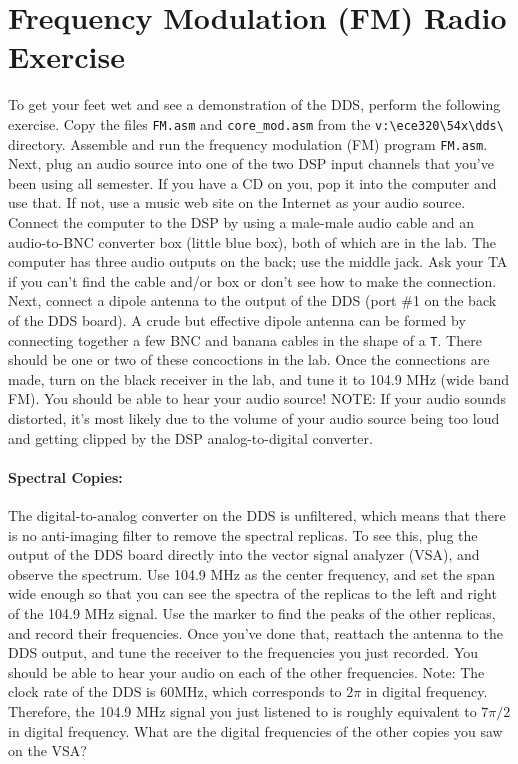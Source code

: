 \section{Frequency Modulation (FM) Radio Exercise}
To get your feet wet and see a demonstration 
of the DDS, perform the following exercise.  
Copy the files \verb+FM.asm+ and \verb+core_mod.asm+ from the 
\verb+v:\ece320\54x\dds\+ directory.  Assemble
 and run the frequency modulation (FM) program
 \verb+FM.asm+.  Next, plug an audio source into one 
of the two DSP input channels that you've been
 using all semester.  If you have a CD on you, 
pop it into the computer and use that.  If not, 
use a music web site on the Internet as your 
audio source.  Connect the computer 
to the DSP by using a male-male 
audio cable and an audio-to-BNC converter box 
(little blue box), both of which are in the lab.  
The computer has three audio outputs on the back; 
use the middle jack.  Ask your TA if you can't 
find the cable and/or box or don't see how to 
make the connection.  Next, connect a dipole antenna 
to the output of the DDS (port \#1 on the back of the DDS board). 
 A crude but effective dipole antenna can be formed
 by connecting together a few BNC and banana cables in the shape of a \verb+T+.  
There should be one or two of these concoctions in the lab.  
Once the connections are made, turn on the black 
receiver in the lab, and tune it to 104.9 MHz 
(wide band FM).  You should be able to hear your 
audio source!  NOTE: If your audio sounds distorted, 
it's most likely due to the volume of your audio 
source being too loud and getting clipped by 
the DSP analog-to-digital converter.

  
\paragraph{Spectral Copies: }The digital-to-analog converter on the DDS is 
unfiltered, which means that there is no anti-imaging filter to 
remove the spectral replicas.  To see this, plug the output of the DDS board 
directly into the vector signal analyzer (VSA), and observe the spectrum.  Use 104.9 MHz as the center
 frequency, and set the span wide enough so that you can see the spectra of the
 replicas to the left and right of the 104.9 MHz signal.  Use the marker to find
 the peaks of the other replicas, and record their frequencies.  Once you've done 
that, reattach the antenna to the DDS output, and tune the receiver to the frequencies
 you just recorded.  You should be able to hear your audio on each of the other 
frequencies.  Note: The clock rate of the DDS is 60MHz, which corresponds to $2\pi$ 
in digital frequency.  Therefore, the 104.9 MHz signal you just 
listened to is roughly equivalent to $7\pi/2$ in digital frequency.  
What are the digital frequencies of the other copies you saw on the VSA? 

